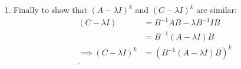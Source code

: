 \documentclass{report}
\begin{document}
{\begin{enumerate}[label=(\arabic*).]
\begin{align*}
            &= \sum\limits_{i=1}^{n} \left( BA \right) _{i i} = tr \left( BA \right)
           .\end{align*}
           Hence, $ tr \left( C \right) = tr \left( B ^{-1} A B \right) = tr \left(  \left( AB \right) B ^{-1} \right)  = tr \left( A \right) $
          \item Finally to show that $ \left( A- \lambda I  \right) ^{k} $ and $ \left( C - \lambda I \right) ^{k}$ are similar:
           \begin{align*}
            \left( C - \lambda I  \right) &= B^{-1} A B - \lambda B^{-1} I B\\
            &= B^{-1} \left( A - \lambda I \right) B\\
            \implies \left( C - \lambda I  \right) ^{k} &= \left( B^{-1} \left( A - \lambda I  \right) B \right) ^{k}\\
           .\end{align*}
      \end{enumerate}
    }
\end{document}
